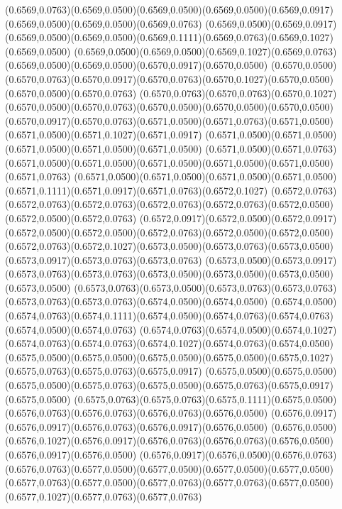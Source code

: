 (0.6569,0.0763)(0.6569,0.0500)(0.6569,0.0500)(0.6569,0.0500)(0.6569,0.0917)(0.6569,0.0500)(0.6569,0.0500)(0.6569,0.0763)
(0.6569,0.0500)(0.6569,0.0917)(0.6569,0.0500)(0.6569,0.0500)(0.6569,0.1111)(0.6569,0.0763)(0.6569,0.1027)(0.6569,0.0500)
(0.6569,0.0500)(0.6569,0.0500)(0.6569,0.1027)(0.6569,0.0763)(0.6569,0.0500)(0.6569,0.0500)(0.6570,0.0917)(0.6570,0.0500)
(0.6570,0.0500)(0.6570,0.0763)(0.6570,0.0917)(0.6570,0.0763)(0.6570,0.1027)(0.6570,0.0500)(0.6570,0.0500)(0.6570,0.0763)
(0.6570,0.0763)(0.6570,0.0763)(0.6570,0.1027)(0.6570,0.0500)(0.6570,0.0763)(0.6570,0.0500)(0.6570,0.0500)(0.6570,0.0500)
(0.6570,0.0917)(0.6570,0.0763)(0.6571,0.0500)(0.6571,0.0763)(0.6571,0.0500)(0.6571,0.0500)(0.6571,0.1027)(0.6571,0.0917)
(0.6571,0.0500)(0.6571,0.0500)(0.6571,0.0500)(0.6571,0.0500)(0.6571,0.0500)
\PST@Solid(0.6571,0.0500)(0.6571,0.0763)(0.6571,0.0500)(0.6571,0.0500)(0.6571,0.0500)(0.6571,0.0500)(0.6571,0.0500)(0.6571,0.0763)
(0.6571,0.0500)(0.6571,0.0500)(0.6571,0.0500)(0.6571,0.0500)(0.6571,0.1111)(0.6571,0.0917)(0.6571,0.0763)(0.6572,0.1027)
(0.6572,0.0763)(0.6572,0.0763)(0.6572,0.0763)(0.6572,0.0763)(0.6572,0.0763)(0.6572,0.0500)(0.6572,0.0500)(0.6572,0.0763)
(0.6572,0.0917)(0.6572,0.0500)(0.6572,0.0917)(0.6572,0.0500)(0.6572,0.0500)(0.6572,0.0763)(0.6572,0.0500)(0.6572,0.0500)
(0.6572,0.0763)(0.6572,0.1027)(0.6573,0.0500)(0.6573,0.0763)(0.6573,0.0500)(0.6573,0.0917)(0.6573,0.0763)(0.6573,0.0763)
(0.6573,0.0500)(0.6573,0.0917)(0.6573,0.0763)(0.6573,0.0763)(0.6573,0.0500)(0.6573,0.0500)(0.6573,0.0500)(0.6573,0.0500)
(0.6573,0.0763)(0.6573,0.0500)(0.6573,0.0763)(0.6573,0.0763)(0.6573,0.0763)(0.6573,0.0763)(0.6574,0.0500)(0.6574,0.0500)
(0.6574,0.0500)(0.6574,0.0763)(0.6574,0.1111)(0.6574,0.0500)(0.6574,0.0763)(0.6574,0.0763)(0.6574,0.0500)(0.6574,0.0763)
(0.6574,0.0763)(0.6574,0.0500)(0.6574,0.1027)(0.6574,0.0763)(0.6574,0.0763)(0.6574,0.1027)(0.6574,0.0763)(0.6574,0.0500)
(0.6575,0.0500)(0.6575,0.0500)(0.6575,0.0500)(0.6575,0.0500)(0.6575,0.1027)(0.6575,0.0763)(0.6575,0.0763)(0.6575,0.0917)
(0.6575,0.0500)(0.6575,0.0500)(0.6575,0.0500)(0.6575,0.0763)(0.6575,0.0500)(0.6575,0.0763)(0.6575,0.0917)(0.6575,0.0500)
(0.6575,0.0763)(0.6575,0.0763)(0.6575,0.1111)(0.6575,0.0500)(0.6576,0.0763)(0.6576,0.0763)(0.6576,0.0763)(0.6576,0.0500)
(0.6576,0.0917)(0.6576,0.0917)(0.6576,0.0763)(0.6576,0.0917)(0.6576,0.0500)
\PST@Solid(0.6576,0.0500)(0.6576,0.1027)(0.6576,0.0917)(0.6576,0.0763)(0.6576,0.0763)(0.6576,0.0500)(0.6576,0.0917)(0.6576,0.0500)
(0.6576,0.0917)(0.6576,0.0500)(0.6576,0.0763)(0.6576,0.0763)(0.6577,0.0500)(0.6577,0.0500)(0.6577,0.0500)(0.6577,0.0500)
(0.6577,0.0763)(0.6577,0.0500)(0.6577,0.0763)(0.6577,0.0763)(0.6577,0.0500)(0.6577,0.1027)(0.6577,0.0763)(0.6577,0.0763)
